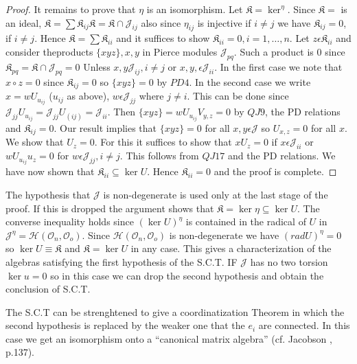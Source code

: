 \begin{proof}
It remains to prove that $\eta$ is an isomorphism. Let
$\mathfrak{K}=\ker^{\eta}$. Since $\mathfrak{K}=$ is an ideal,
$\mathfrak{K}=\sum \mathfrak{K}_{ij}\mathfrak{K}=\mathfrak{K}\cap
\mathscr{J}_{ij}$ also since $\eta_{ij}$ is injective if $i\neq j$ we
have $\mathfrak{K}_{ij}=0$, if $i\neq j$. Hence
$\mathfrak{K}=\sum\mathfrak{K}_{ii}$ and it suffices to show
$\mathfrak{K}_{ii}=0, i=1,\ldots,n$. Let $z\epsilon\mathfrak{K}_{ii}$
and consider the\pageoriginale products $\{xyz\},x,y$ in Pierce
modules $\mathscr{J}_{pq}$. Such a product is $0$ since
$\mathfrak{K}_{pq}=\mathfrak{K}\cap \mathscr{J}_{pq}=0$ Unless $x,y
\mathscr{J}_{ij},i\neq j$ or $x,y,\epsilon \mathscr{J}_{ii}$. In the
first case we note that $x\circ z=0$ since $\mathfrak{K}_{ij}=0$ so
$\{xyz\}=0$ by $PD 4$. In the second case we write $x=wU_{u_{ij}}$
($u_{ij}$ as above), $w\epsilon \mathscr{J}_{jj}$ where $j\neq
i$. This can be done since
$\mathscr{J}_{jj}U_{u_{ij}}=\mathscr{J}_{jj}U_{(ij)}=\mathscr{J}_{ii}$. Then
$\{xyz\}=wU_{u_{ij}}V_{y,z}=0$ by $QJ 9$, the PD relations and
$\mathfrak{K}_{ij}=0$. Our result implies that $\{xyz\}=0$ for all
$x,y\epsilon \mathscr{J}$ so $U_{x,z}=0$ for all $x$. We show that
$U_{z}=0$. For this it suffices to show that $xU_z=0$ if $x\epsilon
\mathscr{J}_{ii}$ or $wU_{u_{ij}}u_z=0$ for $w\epsilon
\mathscr{J}_{jj},i\neq j$. This follows from $QJ 17$ and the PD
relations. We have now shown that $\mathfrak{K}_{ii}\subseteq\ker
U$. Hence $\mathfrak{K}_{ii}=0$ and the proof is complete.
\end{proof}

\begin{remarks*}
The hypothesis that $\mathscr{J}$ is non-degenerate is used only at
the  last stage of the proof. If this is dropped the argument shows
that $\mathfrak{K}=\ker \eta\subseteq \ker U$. The converse
inequality holds since $(\ker U)^{\eta}$ is contained in the radical
of $U$ in
$\mathscr{J}^{\eta}=\mathscr{H}(\mathscr{O}_n,\mathscr{O}_o)$. Since
$\mathscr{H}(\mathscr{O}_n,\mathscr{O}_o)$ is non-degenerate we have
$(rad U)^{\eta}=0$ so $\ker U\equiv\mathfrak{K}$ and $\mathfrak{K}=\ker
U$ in any case. This gives a characterization of the algebras
satisfying the first hypothesis of the S.C.T. IF $\mathscr{J}$ has no
two torsion $\ker u=0$ so in this case we can drop the second
hypothesis and obtain the conclusion of S.C.T.

The S.C.T can be strenghtened to give a coordinatization Theorem in
which the second hypothesis is replaced by the weaker one that the
$e_i$ are connected. In this case we get an isomorphism onto a
``canonical matrix algebra'' (cf. Jacobson \cite{Jacobson2}, p.137).
\end{remarks*}
